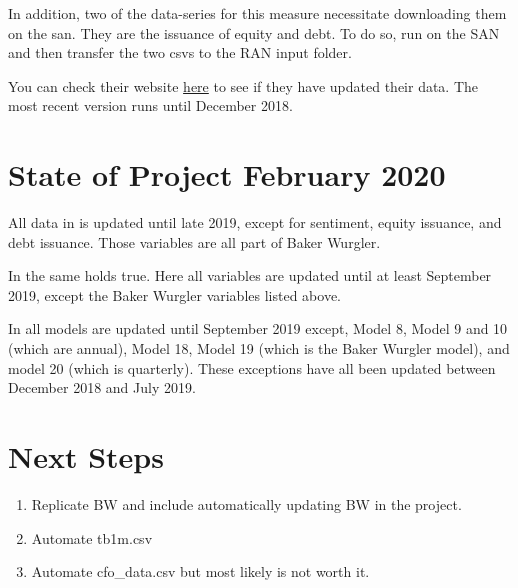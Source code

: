 \documentclass{article}
\begin{document}
	In addition, two of the data-series for this measure necessitate downloading them on the san. They are the issuance of equity and debt. To do so, run  on the SAN and then transfer the two csvs to the RAN input folder.
	
	You can check their website \href{http://people.stern.nyu.edu/jwurgler/}{here} to see if they have updated their data. The most recent version runs until December 2018. 
	
	\section{State of Project February 2020}
	
	All data in  is updated until late 2019, except for sentiment, equity issuance, and debt issuance. Those variables are all part of Baker Wurgler.  
	
	In  the same holds true. Here all variables are updated until at least September 2019, except the Baker Wurgler variables listed above. 
	
	In  all models are updated until September 2019 except, Model 8, Model 9 and 10 (which are annual), Model 18, Model 19 (which is the Baker Wurgler model), and model 20 (which is quarterly). These exceptions have all been updated between December 2018 and July 2019. 
	
	\section{Next Steps}
	\begin{enumerate}
		\item Replicate BW and include automatically updating BW in the project.
		\item Automate tb1m.csv
		\item Automate cfo\_data.csv but most likely is not worth it. 
	\end{enumerate}
	
\end{document}
